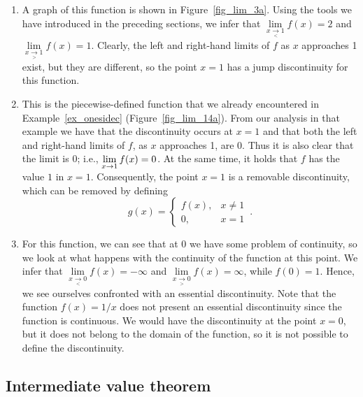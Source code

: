 \begin{example}
\begin{enumerate}
\item A graph of this function is shown in Figure~\ref{fig_lim_3a}. Using the tools we have introduced in the preceding sections, we infer that  $\lim\limits _{x\underset{<}{\rightarrow}1}f(x)=2$ and $\lim\limits _{x\underset{>}{\rightarrow}1}f(x)=1$. Clearly, the left and right-hand limits of $f$ as $x$ approaches 1 exist, but they are different, so the point $x=1$ has a jump discontinuity for this function. 
\item This is the piecewise-defined function that we already encountered in Example~\ref{ex_onesidec} (Figure~\ref{fig_lim_14a}). From our analysis in that example we have that the discontinuity occurs at $x=1$ and that both the left and right-hand limits of $f$, as $x$ approaches 1, are 0. Thus it is also clear that the limit is 0; i.e., $\displaystyle \lim_{x\to 1} f(x) = 0$. At the same time, it holds  that $f$ has the value $1$ in $x=1$. Consequently, the point $x=1$ is a removable discontinuity, which can be removed by defining
$$
g(x)=\begin{cases}f(x),&x\neq 1\\0,&x=1\end{cases}\,.
$$
\item For this function, we can see that at 0 we have some problem of continuity, so we look at what happens with the continuity of the function at this point. We infer that  $\lim\limits _{x\underset{<}{\rightarrow}0}f(x)=-\infty$ and $\lim\limits_{x\underset{>}{\rightarrow}0}f(x)=\infty$, while $f(0)=1$. Hence, we see ourselves confronted with an essential discontinuity. Note that the function $f(x)=1/x$ does not present an essential discontinuity since the function is continuous. We would have the discontinuity at the point $x=0$, but it does not belong to the domain of the function, so it is not possible to define the discontinuity. 
\end{enumerate}

\end{example}

\fi



\subsection{Intermediate value theorem}\label{subsec:IVT}

